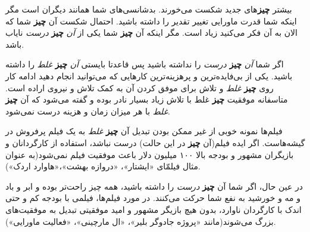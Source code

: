 بیشتر \textbf{چیز}های جدید شکست می‌خورند. بدشانسی‌های شما همانند دیگران
است مگر اینکه شما قدرت ماورایی تغییر تقدیر را داشته باشید. احتمال شکست
آن \textbf{چیز} شما که الان به آن فکر می‌کنید زیاد است. مگر اینکه آن
\textbf{چیز} شما یکی از \emph{آن} \textbf{چیز} \emph{درست} نایاب باشد.

اگر شما \emph{آن} \textbf{چیز} \emph{درست} را نداشته باشید پس قاعدتا
بایستی \emph{آن} \textbf{چیز} \emph{غلط} را داشته باشید. یکی از
بی‌فایده‌ترین و پرهزینه‌ترین کارهایی که می‌توانید انجام دهید ادامه کار
روی \textbf{چیز} \emph{غلط} و تلاش برای موفق کردن آن به کمک تلاش و نیروی
اراده است. متاسفانه موفقیت \textbf{چیز} غلط با تلاش زیاد بسیار نادر بوده
و گفته می‌شود که آن \textbf{چیز} \emph{غلط} با هر میزان زمان و هزینه
درست نمی‌شود.

فیلم‌ها نمونه خوبی از غیر ممکن بودن تبدیل آن \textbf{چیز} \emph{غلط} به
یک فیلم پرفروش در گیشه‌هاست. اگر ایده فیلم(آن \textbf{چیز} در این حالت)
درست نباشد، استفاده از کارگردانان و بازیگران مشهور و بودجه بالا ۱۰۰
میلیون دلار باعث موفقیت فیلم نمی‌شود(به عنوان مثال فیلمّای «ایشتار»،
«دروازه بهشت»،«هاوارد اردک»).

در عین حال، اگر شما آن \textbf{چیز} \emph{درست} را داشته باشید، همه چیز
راحت‌تر بوده و ابر و باد و مه و خورشید به نفع شما حرکت می‌کنند. در مورد
فیلم‌ها، فیلمی با بودجه کم و حتی اندک با کارگردان ناوارد، بدون هیچ
بازیگر مشهور و امید موفقیتی تبدیل به موفقیت‌های بزرگ می‌شوند(مانند
«پروژه جادوگر بلیر»، «ال مارچینی»، «فعالیت ماورایی»).
